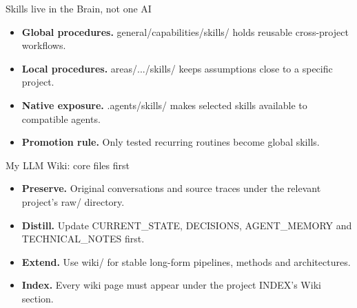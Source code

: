 \begin{frame}{Skills live in the Brain, not one AI}
\begin{itemize}\setlength{\itemsep}{0.85em}
\item \textbf{Global procedures.} general/capabilities/skills/ holds reusable cross-project workflows.
\item \textbf{Local procedures.} areas/.../skills/ keeps assumptions close to a specific project.
\item \textbf{Native exposure.} .agents/skills/ makes selected skills available to compatible agents.
\item \textbf{Promotion rule.} Only tested recurring routines become global skills.
\end{itemize}
\medskip
{}
\end{frame}

\begin{frame}{My LLM Wiki: core files first}
\begin{itemize}\setlength{\itemsep}{0.85em}
\item \textbf{Preserve.} Original conversations and source traces under the relevant project’s raw/ directory.
\item \textbf{Distill.} Update CURRENT\_STATE, DECISIONS, AGENT\_MEMORY and TECHNICAL\_NOTES first.
\item \textbf{Extend.} Use wiki/ for stable long-form pipelines, methods and architectures.
\item \textbf{Index.} Every wiki page must appear under the project INDEX’s Wiki section.
\end{itemize}
\end{frame}

